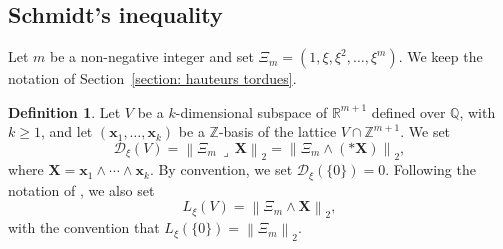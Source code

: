 \documentclass[JEP,XML,SOM,Unicode,NoFloatCountersInSection,published]{cedram}
\newcommand\bx{\boldsymbol{x}}
\newcommand\bX{\boldsymbol{X}}
\newcommand\bQ{\mathbb{Q}}
\newcommand\bR{\mathbb{R}}
\newcommand\bZ{\mathbb{Z}}
\newcommand\HHstar{\mathcal{D}_{\xi}}
\newcommand{\norm}[1]{\left\|#1 \right\|_2}
\theoremstyle{definition}
\newtheorem{Def}{Definition}[section]
\theoremstyle{plain}
\begin{document}
\subsection{Schmidt's inequality}
\label{def petitesse HHstar(V)}

Let $m$ be a non-negative integer and set $\Xi_m = (1,\xi,\xi^2,\dots,\xi^m)$. We keep the notation of Section~\ref{section: hauteurs tordues}.

\begin{Def}
\label{Def: def HHstar}
Let $V$ be a $k$-dimensional subspace of $\bR^{m+1}$ defined over $\bQ$, with $k\geq 1$, and let $(\bx_1,\dots,\bx_k)$ be a $\bZ$-basis of the lattice $V\cap \bZ^{m+1}$. We set
\begin{equation*}
\HHstar(V) = \norm{\Xi_m \, \lrcorner\, \bX } = \norm{\Xi_m \wedge (*\bX)},
\end{equation*}
where $\bX = \bx_1\wedge \cdots \wedge\bx_k$. By convention, we set $\HHstar(\{0\}) = 0$. Following the notation of \cite[\S11]{poels2022simultaneous}, we also set
\begin{equation*}
L_\xi(V) = \norm{\Xi_m \wedge \bX},
\end{equation*}
with the convention that $L_\xi(\{0\}) = \norm{\Xi_m}$.
\end{Def}
\end{document}
